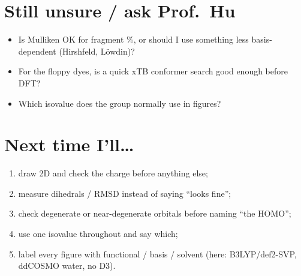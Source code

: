 \documentclass[11pt,a4paper]{article}
\begin{document}
\section*{Still unsure / ask Prof.\ Hu}
\begin{itemize}
  \item Is Mulliken OK for fragment \%, or should I use something less basis-dependent
  (Hirshfeld, L\"owdin)?
  \item For the floppy dyes, is a quick xTB conformer search good enough before DFT?
  \item Which isovalue does the group normally use in figures?
\end{itemize}

\section*{Next time I'll\ldots}
\begin{enumerate}
  \item draw 2D and check the charge before anything else;
  \item measure dihedrals / RMSD instead of saying ``looks fine'';
  \item check degenerate or near-degenerate orbitals before naming ``the HOMO'';
  \item use one isovalue throughout and say which;
  \item label every figure with functional / basis / solvent (here: B3LYP/def2-SVP, ddCOSMO
  water, no D3).
\end{enumerate}
\end{document}
